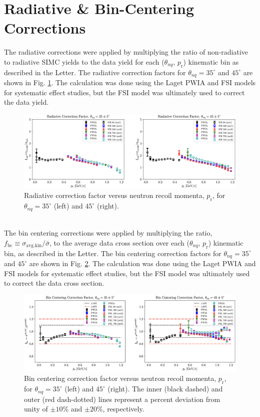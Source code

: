 \documentclass[aps, prl]{revtex4-2}  %
\begin{document}
\section{\large Radiative \& Bin-Centering Corrections}
\noindent The radiative corrections were applied by multiplying the ratio of non-radiative to radiative SIMC yields to the data yield for each ($\theta_{nq}$, $p_{\mathrm{r}}$)
kinematic bin as described in the Letter. The radiative correction factors for $\theta_{nq}=35^{\circ}$ and $45^{\circ}$ are shown in Fig. \ref{fig:fig11}. The calculation was done using the
Laget PWIA and FSI models for systematic effect studies, but the FSI model was ultimately used to correct the data yield.
\begin{figure}[!h]
\includegraphics[scale=0.40]{plots/RC_factor.png}
\caption{Radiative correction factor versus neutron recoil momenta, $p_{\mathrm{r}}$, for $\theta_{nq}=35^{\circ}$ (left) and $45^{\circ}$ (right). }
\label{fig:fig11}
\end{figure}\\
The bin centering corrections were applied by multiplying the ratio, $f_{\mathrm{bc}} \equiv \sigma_{\mathrm{avg.kin}}/\bar{\sigma}$, to the average data cross section over each ($\theta_{nq}$, $p_{\mathrm{r}}$)
kinematic bin, as described in the Letter. The bin centering correction factors for $\theta_{nq}=35^{\circ}$ and $45^{\circ}$ are shown in
Fig. \ref{fig:fig12}. The calculation was done using the Laget PWIA and FSI models for systematic effect studies, but the FSI model was ultimately used to correct the data cross section.
\begin{figure}[!h]
\includegraphics[scale=0.40]{plots/BC_factor.png}
\caption{Bin centering correction factor versus neutron recoil momenta, $p_{\mathrm{r}}$, for $\theta_{nq}=35^{\circ}$ (left) and $45^{\circ}$ (right).
  The inner (black dashed) and outer (red dash-dotted) lines represent a percent deviation from unity of $\pm10\%$ and $\pm20\%$, respectively.}
\label{fig:fig12}
\end{figure}
\end{document}
